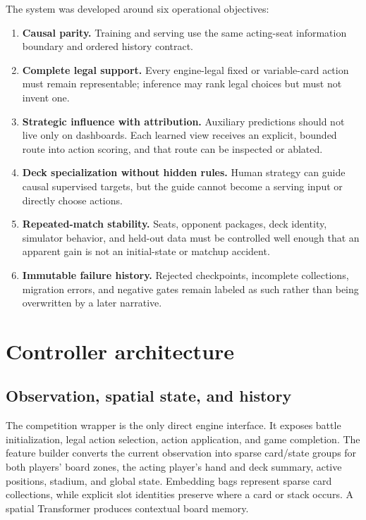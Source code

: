 \documentclass[10pt]{article}
\begin{document}
The system was developed around six operational objectives:

\begin{enumerate}
\item \textbf{Causal parity.} Training and serving use the same acting-seat information boundary and ordered history contract.
\item \textbf{Complete legal support.} Every engine-legal fixed or variable-card action must remain representable; inference may rank legal choices but must not invent one.
\item \textbf{Strategic influence with attribution.} Auxiliary predictions should not live only on dashboards. Each learned view receives an explicit, bounded route into action scoring, and that route can be inspected or ablated.
\item \textbf{Deck specialization without hidden rules.} Human strategy can guide causal supervised targets, but the guide cannot become a serving input or directly choose actions.
\item \textbf{Repeated-match stability.} Seats, opponent packages, deck identity, simulator behavior, and held-out data must be controlled well enough that an apparent gain is not an initial-state or matchup accident.
\item \textbf{Immutable failure history.} Rejected checkpoints, incomplete collections, migration errors, and negative gates remain labeled as such rather than being overwritten by a later narrative.
\end{enumerate}

\section{Controller architecture}

\subsection{Observation, spatial state, and history}

The competition wrapper is the only direct engine interface. It exposes battle initialization, legal action selection, action application, and game completion. The feature builder converts the current observation into sparse card/state groups for both players' board zones, the acting player's hand and deck summary, active positions, stadium, and global state. Embedding bags represent sparse card collections, while explicit slot identities preserve where a card or stack occurs. A spatial Transformer produces contextual board memory.
\end{document}
